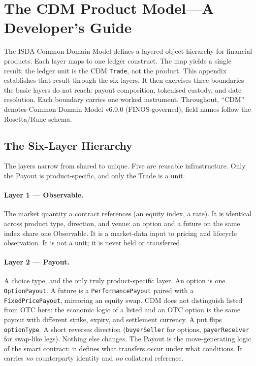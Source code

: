 \section{The CDM Product Model---A Developer's Guide}
\label{app:cdm-walkthrough}

The ISDA Common Domain Model defines a layered object hierarchy for financial products. Each layer maps to one ledger construct. The map yields a single result: the ledger unit is the CDM \texttt{Trade}, not the product. This appendix establishes that result through the six layers. It then exercises three boundaries the basic layers do not reach: payout composition, tokenised custody, and date resolution. Each boundary carries one worked instrument. Throughout, ``CDM'' denotes Common Domain Model v6.0.0 (FINOS-governed); field names follow the Rosetta/Rune schema.

\subsection{The Six-Layer Hierarchy}
\label{sec:cdm-layers}

The layers narrow from shared to unique. Five are reusable infrastructure. Only the Payout is product-specific, and only the Trade is a unit.

\paragraph{Layer 1 --- Observable.} The market quantity a contract references (an equity index, a rate). It is identical across product type, direction, and venue: an option and a future on the same index share one Observable. It is a market-data input to pricing and lifecycle observation. It is not a unit; it is never held or transferred.

\paragraph{Layer 2 --- Payout.} A choice type, and the only truly product-specific layer. An option is one \texttt{OptionPayout}. A future is a \texttt{PerformancePayout} paired with a \texttt{FixedPricePayout}, mirroring an equity swap. CDM does not distinguish listed from OTC here: the economic logic of a listed and an OTC option is the same payout with different strike, expiry, and settlement currency. A put flips \texttt{optionType}. A short reverses direction (\texttt{buyerSeller} for options, \texttt{payerReceiver} for swap-like legs). Nothing else changes. The Payout is the move-generating logic of the smart contract: it defines what transfers occur under what conditions. It carries \emph{no} counterparty identity and \emph{no} collateral reference.

